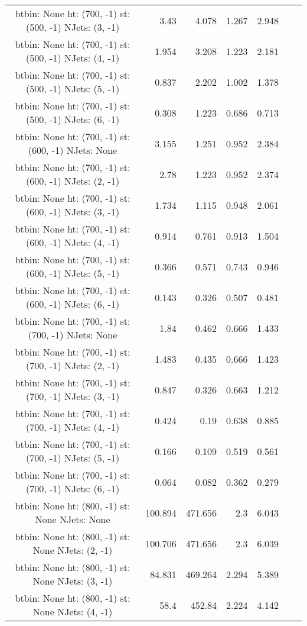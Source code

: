 \documentclass[12pt]{paper}
\begin{document}
\begin{landscape}
\begin{longtable}{c|r|r|r|r|r|r}
btbin:  None ht:  (700, -1) st:  (500, -1) NJets:  (3, -1)
 & 3.43 & 4.078 & 1.267 & 2.948\\
btbin:  None ht:  (700, -1) st:  (500, -1) NJets:  (4, -1)
 & 1.954 & 3.208 & 1.223 & 2.181\\
btbin:  None ht:  (700, -1) st:  (500, -1) NJets:  (5, -1)
 & 0.837 & 2.202 & 1.002 & 1.378\\
btbin:  None ht:  (700, -1) st:  (500, -1) NJets:  (6, -1)
 & 0.308 & 1.223 & 0.686 & 0.713\\
btbin:  None ht:  (700, -1) st:  (600, -1) NJets:  None
 & 3.155 & 1.251 & 0.952 & 2.384\\
btbin:  None ht:  (700, -1) st:  (600, -1) NJets:  (2, -1)
 & 2.78 & 1.223 & 0.952 & 2.374\\
btbin:  None ht:  (700, -1) st:  (600, -1) NJets:  (3, -1)
 & 1.734 & 1.115 & 0.948 & 2.061\\
btbin:  None ht:  (700, -1) st:  (600, -1) NJets:  (4, -1)
 & 0.914 & 0.761 & 0.913 & 1.504\\
btbin:  None ht:  (700, -1) st:  (600, -1) NJets:  (5, -1)
 & 0.366 & 0.571 & 0.743 & 0.946\\
btbin:  None ht:  (700, -1) st:  (600, -1) NJets:  (6, -1)
 & 0.143 & 0.326 & 0.507 & 0.481\\
btbin:  None ht:  (700, -1) st:  (700, -1) NJets:  None
 & 1.84 & 0.462 & 0.666 & 1.433\\
btbin:  None ht:  (700, -1) st:  (700, -1) NJets:  (2, -1)
 & 1.483 & 0.435 & 0.666 & 1.423\\
btbin:  None ht:  (700, -1) st:  (700, -1) NJets:  (3, -1)
 & 0.847 & 0.326 & 0.663 & 1.212\\
btbin:  None ht:  (700, -1) st:  (700, -1) NJets:  (4, -1)
 & 0.424 & 0.19 & 0.638 & 0.885\\
btbin:  None ht:  (700, -1) st:  (700, -1) NJets:  (5, -1)
 & 0.166 & 0.109 & 0.519 & 0.561\\
btbin:  None ht:  (700, -1) st:  (700, -1) NJets:  (6, -1)
 & 0.064 & 0.082 & 0.362 & 0.279\\
btbin:  None ht:  (800, -1) st:  None NJets:  None
 & 100.894 & 471.656 & 2.3 & 6.043\\
btbin:  None ht:  (800, -1) st:  None NJets:  (2, -1)
 & 100.706 & 471.656 & 2.3 & 6.039\\
btbin:  None ht:  (800, -1) st:  None NJets:  (3, -1)
 & 84.831 & 469.264 & 2.294 & 5.389\\
btbin:  None ht:  (800, -1) st:  None NJets:  (4, -1)
 & 58.4 & 452.84 & 2.224 & 4.142\\

\end{longtable}
\end{landscape}
\end{document}
